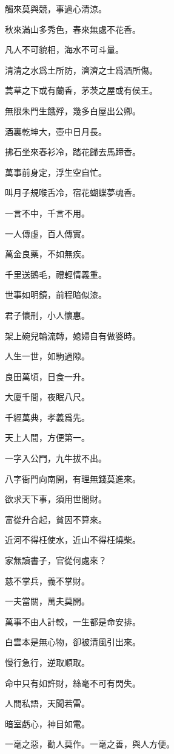 \documentclass[12pt,a4paper]{ctexbook}
\begin{document}
觸來莫與競，事過心清涼。\par
秋來滿山多秀色，春來無處不花香。\par
凡人不可貌相，海水不可斗量。\par
清清之水爲土所防，濟濟之士爲酒所傷。\par
蒿草之下或有蘭香，茅茨之屋或有侯王。\par
無限朱門生餓殍，幾多白屋出公卿。\par
酒裏乾坤大，壺中日月長。\par
拂石坐來春衫冷，踏花歸去馬蹄香。\par
萬事前身定，浮生空自忙。\par
叫月子規喉舌冷，宿花蝴蝶夢魂香。\par
一言不中，千言不用。\par
一人傳虛，百人傳實。\par
萬金良藥，不如無疾。\par
千里送鵝毛，禮輕情義重。\par
世事如明鏡，前程暗似漆。\par
君子懷刑，小人懷惠。\par
架上碗兒輪流轉，媳婦自有做婆時。\par
人生一世，如駒過隙。\par
良田萬頃，日食一升。\par
大廈千間，夜眠八尺。\par
千經萬典，孝義爲先。\par
天上人間，方便第一。\par
一字入公門，九牛拔不出。\par
八字衙門向南開，有理無錢莫進來。\par
欲求天下事，須用世間財。\par
富從升合起，貧因不算來。\par
近河不得枉使水，近山不得枉燒柴。\par
家無讀書子，官從何處來？\par
慈不掌兵，義不掌財。\par
一夫當關，萬夫莫開。\par
萬事不由人計較，一生都是命安排。\par
白雲本是無心物，卻被清風引出來。\par
慢行急行，逆取順取。\par
命中只有如許財，絲毫不可有閃失。\par
人間私語，天聞若雷。\par
暗室虧心，神目如電。\par
一毫之惡，勸人莫作。一毫之善，與人方便。\par
\end{document}
